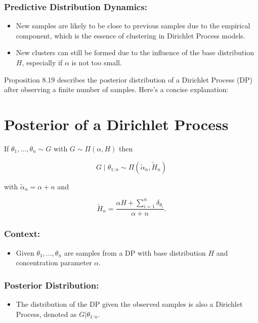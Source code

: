 \documentclass[10pt]{article}
\begin{document}
\subsubsection*{Predictive Distribution Dynamics:}
\begin{itemize}
  \item New samples are likely to be close to previous samples due to the empirical component, which is the essence of clustering in Dirichlet Process models.
  \item New clusters can still be formed due to the influence of the base distribution \( H \), especially if \( \alpha \) is not too small.
\end{itemize}

Proposition 8.19 describes the posterior distribution of a Dirichlet Process (DP) after observing a finite number of samples. Here's a concise explanation:

\section*{Posterior of a Dirichlet Process}
If $\theta_1, \ldots, \theta_n \sim G$ with $G \sim \Pi(\alpha, H)$ then

$$
G \mid \theta_{1: n} \sim \Pi\left(\tilde{\alpha}_n, \tilde{H}_n\right)
$$

with $\tilde{\alpha}_n=\alpha+n$ and

$$
\tilde{H}_n=\frac{\alpha H+\sum_{i=1}^n \delta_{\theta_i}}{\alpha+n} .
$$

\subsubsection*{Context:}
\begin{itemize}
  \item Given \( \theta_1, ..., \theta_n \) are samples from a DP with base distribution \( H \) and concentration parameter \( \alpha \).
\end{itemize}

\subsubsection*{Posterior Distribution:}
\begin{itemize}
  \item The distribution of the DP given the observed samples is also a Dirichlet Process, denoted as \( G|\theta_{1:n} \).
\end{itemize}
\end{document}
